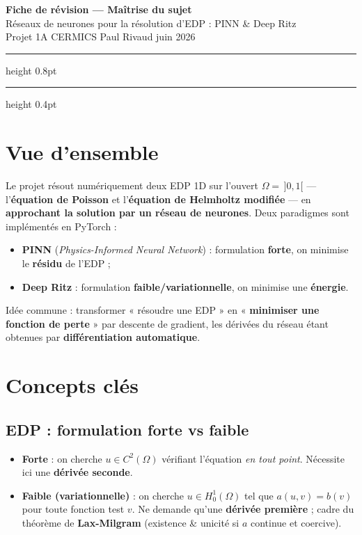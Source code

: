 \documentclass[11pt]{article}
\newcommand{\key}[1]{\textbf{#1}}
\begin{document}
\begin{center}
  {\sffamily\bfseries\color{dblue}\Large Fiche de révision — Maîtrise du sujet}\\[3pt]
  {\sffamily\color{bblue}\large Réseaux de neurones pour la résolution d'EDP : PINN \& Deep Ritz}\\[5pt]
  {\small Projet 1A \;\textbullet\; CERMICS \;\textbullet\; Paul Rivaud \;\textbullet\; juin 2026}
\end{center}
\hrule height 0.8pt
\vspace{4pt}

{\small\tableofcontents}
\vspace{4pt}\hrule height 0.4pt

\section{Vue d'ensemble}
Le projet résout numériquement deux EDP 1D sur l'ouvert $\Omega=\,]0,1[$ —
l'\key{équation de Poisson} et l'\key{équation de Helmholtz modifiée} — en
\key{approchant la solution par un réseau de neurones}. Deux paradigmes sont
implémentés en PyTorch :
\begin{itemize}
  \item \key{PINN} (\emph{Physics-Informed Neural Network}) : formulation
        \key{forte}, on minimise le \key{résidu} de l'EDP ;
  \item \key{Deep Ritz} : formulation \key{faible/variationnelle}, on minimise une
        \key{énergie}.
\end{itemize}
Idée commune : transformer « résoudre une EDP » en « \key{minimiser une fonction de
perte} » par descente de gradient, les dérivées du réseau étant obtenues par
\key{différentiation automatique}.

\section{Concepts clés}

\subsection*{EDP : formulation forte vs faible}
\begin{itemize}
  \item \key{Forte} : on cherche $u\in C^2(\Omega)$ vérifiant l'équation
        \emph{en tout point}. Nécessite ici une \key{dérivée seconde}.
  \item \key{Faible (variationnelle)} : on cherche $u\in H^1_0(\Omega)$ tel que
        $a(u,v)=b(v)$ pour toute fonction test $v$. Ne demande qu'une
        \key{dérivée première} ; cadre du théorème de \key{Lax-Milgram}
        (existence \& unicité si $a$ continue et coercive).
\end{itemize}
\end{document}
